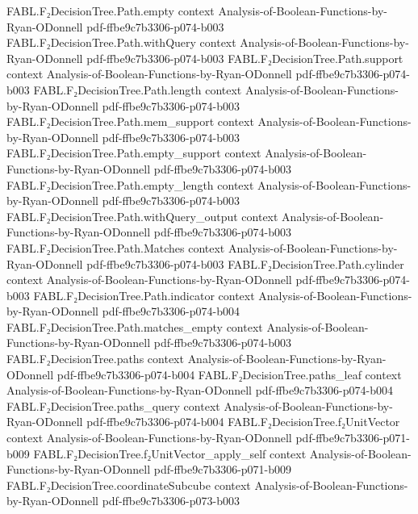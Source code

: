 \begin{theorem}
\proofstep
  {FABL.F₂DecisionTree.Path.empty}
  {context}
  {Analysis-of-Boolean-Functions-by-Ryan-ODonnell}
  {pdf-ffbe9c7b3306-p074-b003}
\proofstep
  {FABL.F₂DecisionTree.Path.withQuery}
  {context}
  {Analysis-of-Boolean-Functions-by-Ryan-ODonnell}
  {pdf-ffbe9c7b3306-p074-b003}
\proofstep
  {FABL.F₂DecisionTree.Path.support}
  {context}
  {Analysis-of-Boolean-Functions-by-Ryan-ODonnell}
  {pdf-ffbe9c7b3306-p074-b003}
\proofstep
  {FABL.F₂DecisionTree.Path.length}
  {context}
  {Analysis-of-Boolean-Functions-by-Ryan-ODonnell}
  {pdf-ffbe9c7b3306-p074-b003}
\proofstep
  {FABL.F₂DecisionTree.Path.mem_support}
  {context}
  {Analysis-of-Boolean-Functions-by-Ryan-ODonnell}
  {pdf-ffbe9c7b3306-p074-b003}
\proofstep
  {FABL.F₂DecisionTree.Path.empty_support}
  {context}
  {Analysis-of-Boolean-Functions-by-Ryan-ODonnell}
  {pdf-ffbe9c7b3306-p074-b003}
\proofstep
  {FABL.F₂DecisionTree.Path.empty_length}
  {context}
  {Analysis-of-Boolean-Functions-by-Ryan-ODonnell}
  {pdf-ffbe9c7b3306-p074-b003}
\proofstep
  {FABL.F₂DecisionTree.Path.withQuery_output}
  {context}
  {Analysis-of-Boolean-Functions-by-Ryan-ODonnell}
  {pdf-ffbe9c7b3306-p074-b003}
\proofstep
  {FABL.F₂DecisionTree.Path.Matches}
  {context}
  {Analysis-of-Boolean-Functions-by-Ryan-ODonnell}
  {pdf-ffbe9c7b3306-p074-b003}
\proofstep
  {FABL.F₂DecisionTree.Path.cylinder}
  {context}
  {Analysis-of-Boolean-Functions-by-Ryan-ODonnell}
  {pdf-ffbe9c7b3306-p074-b003}
\proofstep
  {FABL.F₂DecisionTree.Path.indicator}
  {context}
  {Analysis-of-Boolean-Functions-by-Ryan-ODonnell}
  {pdf-ffbe9c7b3306-p074-b004}
\proofstep
  {FABL.F₂DecisionTree.Path.matches_empty}
  {context}
  {Analysis-of-Boolean-Functions-by-Ryan-ODonnell}
  {pdf-ffbe9c7b3306-p074-b003}
\proofstep
  {FABL.F₂DecisionTree.paths}
  {context}
  {Analysis-of-Boolean-Functions-by-Ryan-ODonnell}
  {pdf-ffbe9c7b3306-p074-b004}
\proofstep
  {FABL.F₂DecisionTree.paths_leaf}
  {context}
  {Analysis-of-Boolean-Functions-by-Ryan-ODonnell}
  {pdf-ffbe9c7b3306-p074-b004}
\proofstep
  {FABL.F₂DecisionTree.paths_query}
  {context}
  {Analysis-of-Boolean-Functions-by-Ryan-ODonnell}
  {pdf-ffbe9c7b3306-p074-b004}
\proofstep
  {FABL.F₂DecisionTree.f₂UnitVector}
  {context}
  {Analysis-of-Boolean-Functions-by-Ryan-ODonnell}
  {pdf-ffbe9c7b3306-p071-b009}
\proofstep
  {FABL.F₂DecisionTree.f₂UnitVector_apply_self}
  {context}
  {Analysis-of-Boolean-Functions-by-Ryan-ODonnell}
  {pdf-ffbe9c7b3306-p071-b009}
\proofstep
  {FABL.F₂DecisionTree.coordinateSubcube}
  {context}
  {Analysis-of-Boolean-Functions-by-Ryan-ODonnell}
  {pdf-ffbe9c7b3306-p073-b003}
\proofstep

\end{theorem}
